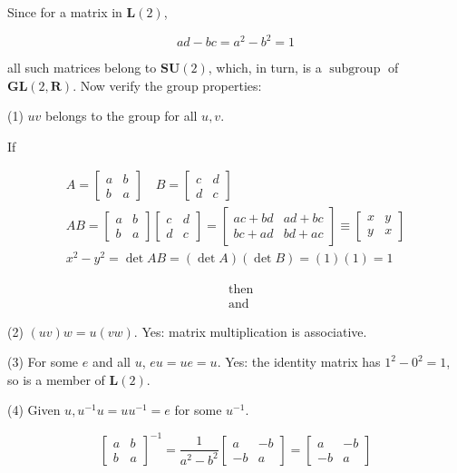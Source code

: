 \documentclass[10pt]{article}
\begin{document}
Since for a matrix in $\mathbf{L}(2)$,

$$
a d-b c=a^{2}-b^{2}=1
$$

all such matrices belong to $\mathbf{S U}(2)$, which, in turn, is a $\operatorname{subgroup}$ of $\mathbf{G L}(2, \mathbf{R})$. Now verify the group properties:

(1) $u v$ belongs to the group for all $u, v$.

If

$$
\begin{gathered}
A=\left[\begin{array}{ll}
a & b \\
b & a
\end{array}\right] \quad B=\left[\begin{array}{ll}
c & d \\
d & c
\end{array}\right] \\
A B=\left[\begin{array}{ll}
a & b \\
b & a
\end{array}\right]\left[\begin{array}{ll}
c & d \\
d & c
\end{array}\right]=\left[\begin{array}{ll}
a c+b d & a d+b c \\
b c+a d & b d+a c
\end{array}\right] \equiv\left[\begin{array}{ll}
x & y \\
y & x
\end{array}\right] \\
x^{2}-y^{2}=\operatorname{det} A B=(\operatorname{det} A)(\operatorname{det} B)=(1)(1)=1
\end{gathered}
$$

$$
\begin{aligned}
& \text { then } \\
& \text { and }
\end{aligned}
$$

(2) $(u v) w=u(v w)$. Yes: matrix multiplication is associative.

(3) For some $e$ and all $u$, $e u=u e=u$. Yes: the identity matrix has $1^{2}-0^{2}=1$, so is a member of $\mathbf{L}(2)$.

(4) Given $u, u^{-1} u=u u^{-1}=e$ for some $u^{-1}$.

$$
\left[\begin{array}{ll}
a & b \\
b & a
\end{array}\right]^{-1}=\frac{1}{a^{2}-b^{2}}\left[\begin{array}{rr}
a & -b \\
-b & a
\end{array}\right]=\left[\begin{array}{rr}
a & -b \\
-b & a
\end{array}\right]
$$
\end{document}
